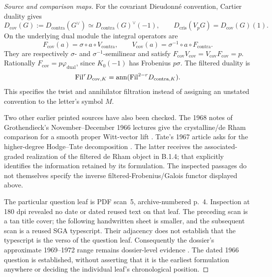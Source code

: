 \begin{proof}[Source and comparison maps]
For the covariant Dieudonn\'e convention, Cartier duality gives
\[
 D_{\mathrm{cov}}(G):=D_{\mathrm{contra}}(G^\vee)
 \simeq D_{\mathrm{contra}}(G)^\vee(-1),
 \qquad
 D_{\mathrm{cris}}(V_pG)=D_{\mathrm{cov}}(G)(1).
\]
On the underlying dual module the integral operators are
\[
 F_{\mathrm{cov}}(a)=\sigma\circ a\circ V_{\mathrm{contra}},
 \qquad
 V_{\mathrm{cov}}(a)=\sigma^{-1}\circ a\circ F_{\mathrm{contra}}.
\]
They are respectively $\sigma$- and $\sigma^{-1}$-semilinear and satisfy
$F_{\mathrm{cov}}V_{\mathrm{cov}}=V_{\mathrm{cov}}F_{\mathrm{cov}}=p$.
Rationally $F_{\mathrm{cov}}=p\varphi_{\mathrm{dual}}$, since
$K_0(-1)$ has Frobenius $p\sigma$.
The filtered duality is
\[
 \mathrm{Fil}^rD_{\mathrm{cov},K}
 =\operatorname{ann}(\mathrm{Fil}^{2-r}D_{\mathrm{contra},K}).
\]
This specifies the twist and annihilator filtration instead of assigning an unstated convention to the letter's symbol $M$.

Two other earlier printed sources have also been checked. The 1968 notes of Grothendieck's November--December 1966 lectures give the crystalline/de Rham comparison for a smooth proper Witt-vector lift \cite[\S7.2, pp.352--353]{AuditGrothendieckCrystals1968}. Tate's 1967 article asks for the higher-degree Hodge--Tate decomposition \cite[p.180, Remark]{Tate1967}. The latter receives the associated-graded realization of the filtered de Rham object in B.1.4; that explicitly identifies the information retained by its formulation. The inspected passages do not themselves specify the inverse filtered-Frobenius/Galois functor displayed above.

The particular question leaf is PDF scan~5, archive-numbered p.~4. Inspection at 180 dpi revealed no date or dated reused text on that leaf. The preceding scan is a tan title cover; the following handwritten sheet is smaller, and the subsequent scan is a reused SGA typescript. Their adjacency does not establish that the typescript is the verso of the question leaf. Consequently the dossier's approximate 1969--1972 range remains dossier-level evidence \cite[cover and scans 4--7]{GrothendieckCote18Scan}. The dated 1966 question is established, without asserting that it is the earliest formulation anywhere or deciding the individual leaf's chronological position.
\end{proof}
